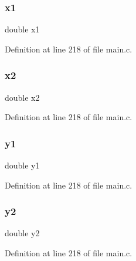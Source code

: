 \subsubsection{x1}
{\footnotesize\ttfamily double x1}



Definition at line 218 of file main.\+c.

\mbox{\label{main_8c_adcf04f5f1964d18b332643939561da0d}} 
\subsubsection{x2}
{\footnotesize\ttfamily double x2}



Definition at line 218 of file main.\+c.

\mbox{\label{main_8c_ac3b72e5b77595ca2340ecf8ccfe5fd99}} 
\subsubsection{y1}
{\footnotesize\ttfamily double y1}



Definition at line 218 of file main.\+c.

\mbox{\label{main_8c_a5347e514ebe985fb371754ffd2b5ff83}} 
\subsubsection{y2}
{\footnotesize\ttfamily double y2}



Definition at line 218 of file main.\+c.

